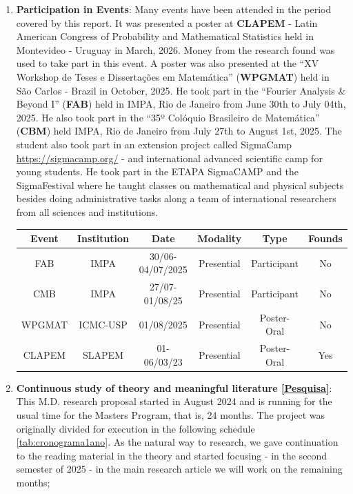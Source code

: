 \documentclass[12pt]{report}
\begin{document}
\begin{enumerate}
	
	\item \textbf{Participation in Events}: Many events have been attended in the period covered by this report. It was presented a poster at \textbf{CLAPEM} - Latin American Congress of Probability and Mathematical Statistics held in Montevideo - Uruguay in March, 2026. Money from the research found was used to take part in this event.  A poster was also presented at the \enquote{XV Workshop de Teses e Dissertações em Matemática} (\textbf{WPGMAT}) held in São Carlos - Brazil in October, 2025. He took part in the \enquote{Fourier Analysis \& Beyond I} (\textbf{FAB}) held in IMPA, Rio de Janeiro from June 30th to July 04th, 2025. He also took part in the \enquote{35º Colóquio Brasileiro de Matemática} (\textbf{CBM}) held IMPA, Rio de Janeiro from July 27th to August 1st, 2025. The student also took part in an extension project called SigmaCamp \url{https://sigmacamp.org/} - and international advanced scientific camp for young students. He took part in the ETAPA SigmaCAMP and the SigmaFestival where he taught classes on mathematical and physical subjects besides doing administrative tasks along a team of international researchers from all sciences and institutions.
	
	\begin{center}
		\begin{tabular}{|c|c|c|c|c|c|}
			\hline
			Event &  Institution & Date & Modality & Type & Founds \\
			\hline
			FAB & IMPA & 30/06-04/07/2025 & Presential & Participant& No \\
			\hline
			CMB & IMPA & 27/07-01/08/25 & Presential & Participant & No \\
			\hline
			WPGMAT & ICMC-USP & 01/08/2025 & Presential & Poster-Oral & No \\
			\hline
			CLAPEM & SLAPEM & 01-06/03/23 & Presential & Poster-Oral & Yes \\
			\hline
		\end{tabular}
	\end{center}
	
	\item \textbf{Continuous study of theory and meaningful literature \ref{Pesquisa}}: This M.D. research proposal started in August 2024 and is running for the usual time for the Masters Program, that is, 24 months.  The project was originally divided for execution in the following schedule \ref{tab:cronograma1ano}. As the natural way to research, we gave continuation to the reading material in the theory and started focusing -  in the second semester of 2025 - in the main research article \cite{Byun_2023} we will work on the remaining months;
	

\end{enumerate}
\end{document}
